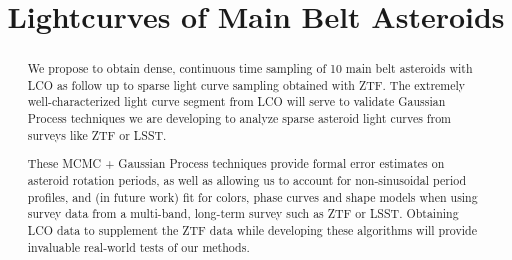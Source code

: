 \documentclass[11pt]{article}
\begin{document}
\title{Lightcurves of Main Belt Asteroids}



%


\begin{abstract}
We propose to obtain dense, continuous time sampling of 10 main belt asteroids with LCO as follow up to sparse light curve sampling obtained with ZTF. The extremely well-characterized light curve segment from LCO will serve to validate Gaussian Process techniques we are developing to analyze sparse asteroid light curves from surveys like ZTF or LSST.

These MCMC + Gaussian Process techniques provide formal error estimates on asteroid rotation periods, as well as allowing us to account for non-sinusoidal period profiles, and (in future work) fit for colors, phase curves and shape models when using survey data from a multi-band, long-term survey such as ZTF or LSST. Obtaining LCO data to supplement the ZTF data while developing these algorithms will provide invaluable real-world tests of our methods.

\end{abstract}

\end{document}
